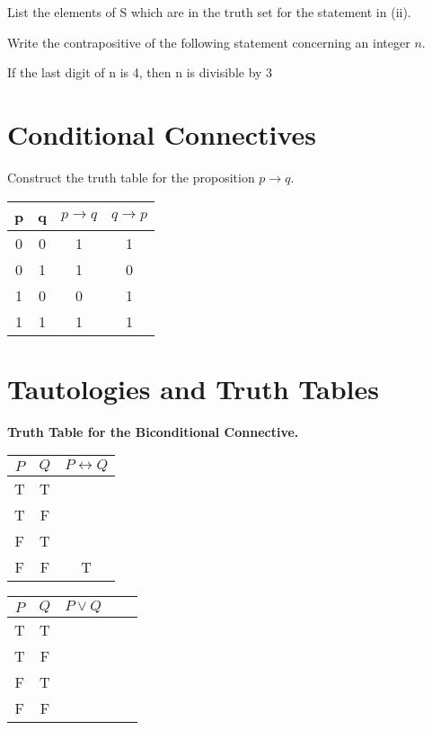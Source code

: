 \documentclass[]{report}
\begin{document}
List the elements of S which are in the truth set for the statement in (ii).

Write the contrapositive of the following statement concerning an integer $n$.

If the last digit of n is 4, then n is divisible by 3

\section{Conditional Connectives}
Construct the truth table for the proposition $p \rightarrow q$.

\begin{center}
	\begin{tabular}{|c|c|c|c|}
		\hline
		p & q & $p \rightarrow q$ & $q \rightarrow p$ \\
		\hline
		0 & 0 & 1& 1 \\
		0 & 1 & 1 & 0 \\
		1 & 0 & 0 & 1 \\
		1 & 1 & 1 & 1 \\
		\hline
	\end{tabular}
\end{center}

\section{Tautologies and Truth Tables}
\textbf{Truth Table for the Biconditional Connective.} \bigskip
\begin{center}
	\begin{tabular}{|c|c|c|}
		\hline $P$  & $Q$ & $P \leftrightarrow Q$ \\ \hline
		\hline T & T &   \\ 
		\hline T & F &    \\ 
		\hline F & T &    \\ 
		\hline \phantom{sp}F \phantom{sp} & \phantom{sp}F \phantom{sp} & \phantom{sp}T \phantom{sp} \\
		\hline 
	\end{tabular} 
\end{center}

\begin{tabular}{|c|c|c|c|c|}
	\hline $P$ & $Q$ & $P \vee Q$ &  &  \\ \hline
	\hline T & T &  &  &  \\ 
	\hline T & F &  &  &  \\ 
	\hline F & T &  &  &  \\ 
	\hline \phantom{sp}F \phantom{sp} & \phantom{sp}F \phantom{sp} & \phantom{spacespa} & \phantom{spacespa}  & \phantom{spacespa} \\ 
	
	\hline 
\end{tabular} 
\end{document}
